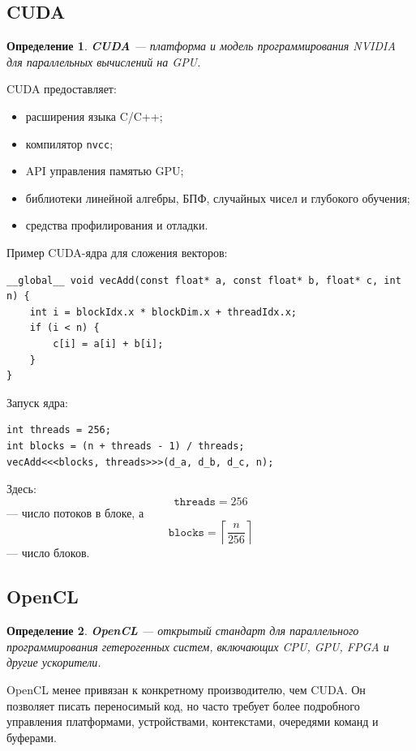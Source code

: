 \documentclass[12pt,a4paper]{article}
\newtheorem{definition}{Определение}
\begin{document}
\subsection{CUDA}

\begin{definition}
\textbf{CUDA} --- платформа и модель программирования NVIDIA для параллельных вычислений на GPU.
\end{definition}

CUDA предоставляет:

\begin{itemize}
    \item расширения языка C/C++;
    \item компилятор \texttt{nvcc};
    \item API управления памятью GPU;
    \item библиотеки линейной алгебры, БПФ, случайных чисел и глубокого обучения;
    \item средства профилирования и отладки.
\end{itemize}

Пример CUDA-ядра для сложения векторов:

\begin{lstlisting}[style=cuda]
__global__ void vecAdd(const float* a, const float* b, float* c, int n) {
    int i = blockIdx.x * blockDim.x + threadIdx.x;
    if (i < n) {
        c[i] = a[i] + b[i];
    }
}
\end{lstlisting}

Запуск ядра:

\begin{lstlisting}[style=cuda]
int threads = 256;
int blocks = (n + threads - 1) / threads;
vecAdd<<<blocks, threads>>>(d_a, d_b, d_c, n);
\end{lstlisting}

Здесь:
\[
    \texttt{threads} = 256
\]
--- число потоков в блоке, а
\[
    \texttt{blocks} = \left\lceil \frac{n}{256} \right\rceil
\]
--- число блоков.

\subsection{OpenCL}

\begin{definition}
\textbf{OpenCL} --- открытый стандарт для параллельного программирования гетерогенных систем, включающих CPU, GPU, FPGA и другие ускорители.
\end{definition}

OpenCL менее привязан к конкретному производителю, чем CUDA. Он позволяет писать переносимый код, но часто требует более подробного управления платформами, устройствами, контекстами, очередями команд и буферами.
\end{document}
